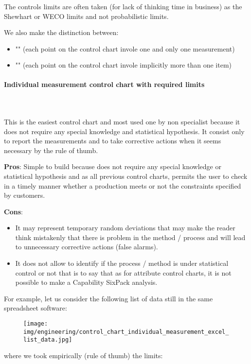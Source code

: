 	The controls limits are often taken (for lack of thinking time in business) as the Shewhart or WECO limits and not probabilistic limits.
	
	We also make the distinction between:
	\begin{itemize}
		\item "" (each point on the control chart invole one and only one measurement)

		\item "" (each point on the control chart invole implicitly more than one item)
	\end{itemize}
	
	\paragraph{Individual measurement control chart with required limits}\mbox{}\\\\
	This is the easiest control chart and most used one by non specialist because it does not require any special knowledge and statistical hypothesis. It consist only to report the measurements and to take corrective actions when it seems necessary by the rule of thumb.
	
	\textbf{Pros}: Simple to build because does not require any special knowledge or statistical hypothesis and as all previous control charts, permits the user to check in a timely manner whether a production meets or not the constraints specified by customers.

	\textbf{Cons}:
	\begin{itemize}
		\item It may represent temporary random deviations that may make the reader think mistakenly that there is problem in the method / process and will lead to unnecessary corrective actions (false alarms). 
		
		\item  It does not allow to identify if the process / method is under statistical control or not that is to say that as for attribute control charts, it is not possible to make a Capability SixPack analysis.
 	\end{itemize}
 	For example, let us consider the following list of data still in the same spreadsheet software:
 	\begin{figure}[H]
		\centering
		\texttt{[image: img/engineering/control\_chart\_individual\_measurement\_excel\_list\_data.jpg]}
	\end{figure}
	where we took empirically (rule of thumb) the limits:
	
